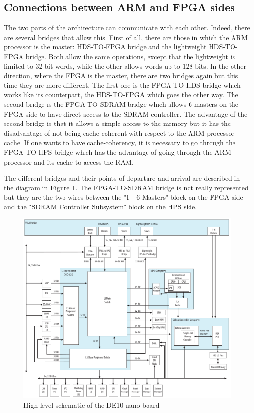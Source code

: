 \documentclass[12pt]{article}
\begin{document}
\subsection{Connections between ARM and FPGA sides}

The two parts of the architecture can communicate with each other. Indeed, there are several bridges that allow this. First of all, there are those in which the ARM processor is the master: HDS-TO-FPGA bridge and the lightweight HDS-TO-FPGA bridge. Both allow the same operations, except that the lightweight is limited to 32-bit words, while the other allows words up to 128 bits. In the other direction, where the FPGA is the master, there are two bridges again but this time they are more different. The first one is the FPGA-TO-HDS bridge which works like its counterpart, the HDS-TO-FPGA which goes the other way. The second bridge is the FPGA-TO-SDRAM bridge which allows 6 masters on the FPGA side to have direct access to the SDRAM controller. The advantage of the second bridge is that it allows a simple access to the memory but it has the disadvantage of not being cache-coherent with respect to the ARM processor cache. If one wants to have cache-coherency, it is necessary to go through the FPGA-TO-HPS bridge which has the advantage of going through the ARM processor and its cache to access the RAM.

\vspace{12pt}
The different bridges and their points of departure and arrival are described in the diagram in Figure \ref{fig:de10nano_schematic}. The FPGA-TO-SDRAM bridge is not really represented but they are the two wires between the "1 - 6 Masters" block on the FPGA side and the "SDRAM Controller Subsystem" block on the HPS side.

\begin{figure}[ht!]
  \center
  \includegraphics[width=12cm]{"res/chapter1/board_schematic.png"}
  \caption{High level schematic of the DE10-nano board}
  \label{fig:de10nano_schematic}
\end{figure}
\end{document}
